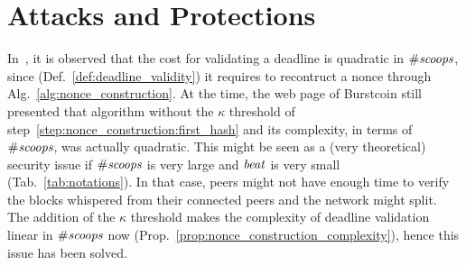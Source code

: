 \section{Attacks and Protections}\label{sec:attacks_and_protections}
%
In~\cite{ParkKFGAP18}, it is observed that the cost for validating
a deadline is quadratic in ${\#\mathit{scoops}}$,
since (Def.~\ref{def:deadline_validity}) it
requires to recontruct a nonce through
Alg.~\ref{alg:nonce_construction}. At the time, the web page of
Burstcoin still presented that algorithm
without the $\kappa$ threshold of step~\ref{step:nonce_construction:first_hash}
and its complexity, in terms of ${\#\mathit{scoops}}$, was actually quadratic.
This might be seen as a (very theoretical)
security issue if ${\#\mathit{scoops}}$ is very large
and ${\mathit{beat}}$ is very small (Tab.~\ref{tab:notations}). In that case,
peers might not have enough time to verify the blocks whispered
from their connected peers and the network might split.
The addition of the $\kappa$ threshold makes the complexity
of deadline validation linear in ${\#\mathit{scoops}}$ now
(Prop.~\ref{prop:nonce_construction_complexity}), hence this
issue has been solved.
